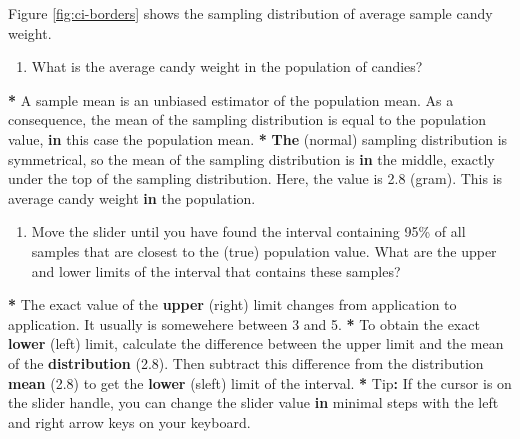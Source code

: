 \documentclass[a4paper]{book}
\newenvironment{Shaded}{\begin{snugshade}}{\end{snugshade}}
\newcommand{\KeywordTok}[1]{\textcolor[rgb]{0,0,0}{\textbf{#1}}}
\newcommand{\DecValTok}[1]{\textcolor[rgb]{0.00,0.00,0.00}{#1}}
\newcommand{\FloatTok}[1]{\textcolor[rgb]{0.00,0.00,0.00}{#1}}
\newcommand{\StringTok}[1]{\textcolor[rgb]{0.00,0.00,0.00}{#1}}
\newcommand{\ControlFlowTok}[1]{\textcolor[rgb]{0.00,0.00,0.00}{\textbf{#1}}}
\newcommand{\OperatorTok}[1]{\textcolor[rgb]{0.00,0.00,0.00}{\textbf{#1}}}
\newcommand{\NormalTok}[1]{#1}
\providecommand{\tightlist}{%
  \setlength{\itemsep}{0pt}\setlength{\parskip}{0pt}}
\theoremstyle{definition}
\theoremstyle{definition}
\theoremstyle{definition}
\theoremstyle{remark}
\begin{document}
Figure \ref{fig:ci-borders} shows the sampling distribution of average
sample candy weight.

\begin{enumerate}
\def\labelenumi{\arabic{enumi}.}
\tightlist
\item
  What is the average candy weight in the population of candies?
\end{enumerate}

\begin{Shaded}
\begin{Highlighting}[]
\OperatorTok{*}\StringTok{ }\NormalTok{A sample mean is an unbiased estimator of the population mean. As a}
\NormalTok{consequence, the mean of the sampling distribution is equal to the population }
\NormalTok{value, }\ControlFlowTok{in}\NormalTok{ this case the population mean.}
\OperatorTok{*}\StringTok{ }\KeywordTok{The}\NormalTok{ (normal) sampling distribution is symmetrical, so the mean of the}
\NormalTok{sampling distribution is }\ControlFlowTok{in}\NormalTok{ the middle, exactly under the top of the sampling}
\NormalTok{distribution. Here, the value is }\FloatTok{2.8}\NormalTok{ (gram). This is average candy weight }\ControlFlowTok{in}
\NormalTok{the population.}
\end{Highlighting}
\end{Shaded}

\begin{enumerate}
\def\labelenumi{\arabic{enumi}.}
\setcounter{enumi}{1}
\tightlist
\item
  Move the slider until you have found the interval containing 95\% of
  all samples that are closest to the (true) population value. What are
  the upper and lower limits of the interval that contains these
  samples?
\end{enumerate}

\begin{Shaded}
\begin{Highlighting}[]
\OperatorTok{*}\StringTok{ }\NormalTok{The exact value of the }\KeywordTok{upper}\NormalTok{ (right) limit changes from application to}
\NormalTok{application. It usually is somewehere between }\DecValTok{3}\NormalTok{ and }\DecValTok{5}\NormalTok{. }
\OperatorTok{*}\StringTok{ }\NormalTok{To obtain the exact }\KeywordTok{lower}\NormalTok{ (left) limit, calculate the difference between the}
\NormalTok{upper limit and the mean of the }\KeywordTok{distribution}\NormalTok{ (}\FloatTok{2.8}\NormalTok{). Then subtract this}
\NormalTok{difference from the distribution }\KeywordTok{mean}\NormalTok{ (}\FloatTok{2.8}\NormalTok{) to get the }\KeywordTok{lower}\NormalTok{ (sleft) limit of}
\NormalTok{the interval.}
\OperatorTok{*}\StringTok{ }\NormalTok{Tip}\OperatorTok{:}\StringTok{ }\NormalTok{If the cursor is on the slider handle, you can change the slider value}
\ControlFlowTok{in}\NormalTok{ minimal steps with the left and right arrow keys on your keyboard.}
\end{Highlighting}
\end{Shaded}
\end{document}
